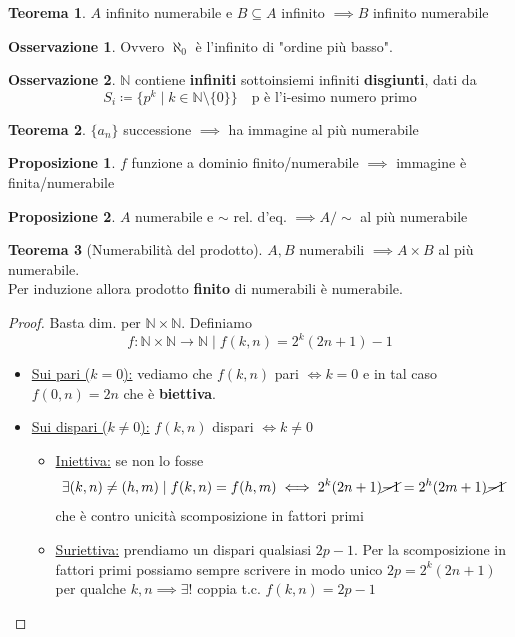 \documentclass[a4paper,10pt]{article}
\theoremstyle{definition}
\newcommand{\na}{\mathbb{N}} %
\theoremstyle{indentdefinition}
\theoremstyle{indentpostulate}
\theoremstyle{indenttheorem}
\newtheorem{thm}{Teorema}[section]
\newtheorem{prop}{Proposizione}[section]
\theoremstyle{myremark}
\newtheorem*{rem*}{Osservazione}
\theoremstyle{indentgeneral}
\newenvironment{myboxed} 
{\noindent\begin{lrbox}{\mybox}\begin{minipage}{\textwidth}}
{\end{minipage}\end{lrbox}\fbox{\usebox{\mybox}}}
\begin{document}
\begin{thm}
    $A$ infinito numerabile e $B\subseteq A$ infinito $\implies B$ infinito numerabile
\end{thm}
\begin{rem*}
    Ovvero $\aleph_0$ è l'infinito di "ordine più basso".
\end{rem*}

\begin{rem*}
    $\na$ contiene \textbf{infiniti} sottoinsiemi infiniti \textbf{disgiunti}, dati da
    $$S_i\coloneqq\{p^k\mid k\in\na\setminus\{0\}\}\quad \text{p è l'i-esimo numero primo}$$
\end{rem*}

\begin{thm}
    $\{a_n\}$ successione $\implies$ ha immagine al più numerabile
\end{thm}

\begin{prop}
    $f$ funzione a dominio finito/numerabile $\implies$ immagine è finita/numerabile
\end{prop}

\begin{prop}
    $A$ numerabile e $\sim$ rel. d'eq. $\implies A/\sim$ al più numerabile
\end{prop}

\begin{myboxed}
\begin{thm}[Numerabilità del prodotto] \label{thm-numerabilità-prodotto}
    $A,B$ numerabili $\implies A\times B$ al più numerabile. \\
    Per induzione allora prodotto \textbf{finito} di numerabili è numerabile.
\end{thm}
\end{myboxed}

\begin{proof}
    Basta dim. per $\na\times\na$. Definiamo
   $$f:\na\times\na\to\na\mid f(k,n)=2^k(2n+1)-1$$
   \begin{itemize}
       \item \underline{Sui pari ($k=0$):} vediamo che $f(k,n)$ pari $\iff k=0$ e in tal caso $f(0,n)=2n$ che è \textbf{biettiva}.
        \item \underline{Sui dispari ($k\ne0$):} $f(k,n)$ dispari $\iff k\ne0$
        \begin{itemize}
            \item \underline{Iniettiva:} se non lo fosse
            $$\exists (k,n)\ne (h,m)\mid f(k,n)=f(h,m)\iff 2^k(2n+1)\cancel{-1}=2^h(2m+1)\cancel{-1}$$
            che è contro unicità scomposizione in fattori primi \lightning
            \item \underline{Suriettiva:} prendiamo un dispari qualsiasi $2p-1$. Per la scomposizione in fattori primi possiamo sempre scrivere in modo unico $2p=2^k(2n+1)$ per qualche $k,n\implies\exists!$ coppia t.c. $f(k,n)=2p-1$  
        \end{itemize}
   \end{itemize}
\end{proof}
\end{document}
